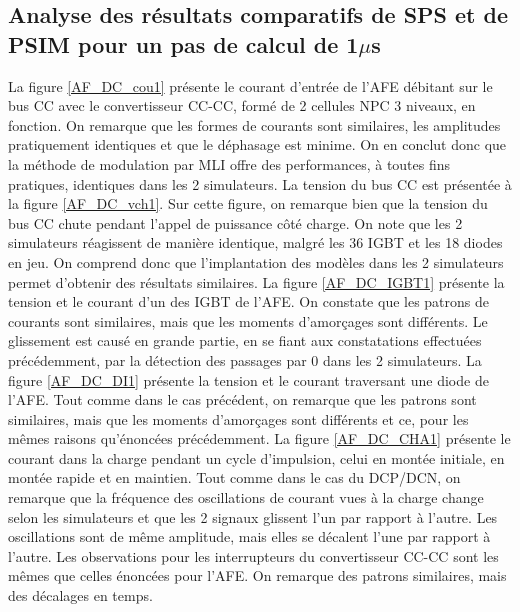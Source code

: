 \subsection{Analyse des résultats comparatifs de SPS et de PSIM pour un pas de calcul de 1$\mu$s}
La figure \ref{AF_DC_cou1} présente le courant d'entrée de l'AFE débitant sur le bus CC avec le convertisseur CC-CC, formé de 2 cellules NPC 3 niveaux, en fonction. On remarque que les formes de courants sont similaires, les amplitudes pratiquement identiques et que le déphasage est minime. On en conclut donc que la méthode de modulation par MLI offre des performances, à toutes fins pratiques, identiques dans les 2 simulateurs.
La tension du bus CC est présentée à la figure \ref{AF_DC_vch1}. Sur cette figure, on remarque bien que la tension du bus CC chute pendant l'appel de puissance côté charge. On note que les 2 simulateurs réagissent de manière identique, malgré les 36 IGBT et les 18 diodes en jeu. On comprend donc que l'implantation des modèles dans les 2 simulateurs permet d'obtenir des résultats similaires. 
La figure \ref{AF_DC_IGBT1} présente la tension et le courant d'un des IGBT de l'AFE. On constate que les patrons de courants sont similaires, mais que les moments d'amorçages sont différents. Le glissement est causé en grande partie, en se fiant aux constatations effectuées précédemment, par la détection des passages par 0 dans les 2 simulateurs.
La figure \ref{AF_DC_DI1} présente la tension et le courant traversant une diode de l'AFE. Tout comme dans le cas précédent, on remarque que les patrons sont similaires, mais que les moments d'amorçages sont différents et ce, pour les mêmes raisons qu'énoncées précédemment.
La figure \ref{AF_DC_CHA1} présente le courant dans la charge pendant un cycle d'impulsion, celui en montée initiale, en montée rapide et en maintien. Tout comme dans le cas du DCP/DCN, on remarque que la fréquence des oscillations de courant vues à la charge change selon les simulateurs et que les 2 signaux glissent l'un par rapport à l'autre. Les oscillations sont de même amplitude, mais elles se décalent l'une par rapport à l'autre.
Les observations pour les interrupteurs du convertisseur CC-CC sont les mêmes que celles énoncées pour l'AFE. On remarque des patrons similaires, mais des décalages en temps.